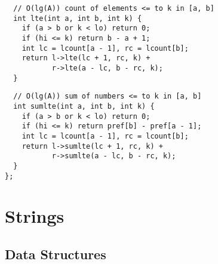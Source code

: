 \documentclass[twoside]{article}
\newcommand{\fileTitleStyle}{\large\underline}
\begin{document}
\begin{multicols*}{2}
\begin{verbatim}
  // O(lg(A)) count of elements <= to k in [a, b]
  int lte(int a, int b, int k) {
    if (a > b or k < lo) return 0;
    if (hi <= k) return b - a + 1;
    int lc = lcount[a - 1], rc = lcount[b];
    return l->lte(lc + 1, rc, k) +
           r->lte(a - lc, b - rc, k);
  }
\end{verbatim}
\vspace{-12pt}
\begin{verbatim}
  // O(lg(A)) sum of numbers <= to k in [a, b]
  int sumlte(int a, int b, int k) {
    if (a > b or k < lo) return 0;
    if (hi <= k) return pref[b] - pref[a - 1];
    int lc = lcount[a - 1], rc = lcount[b];
    return l->sumlte(lc + 1, rc, k) +
           r->sumlte(a - lc, b - rc, k);
  }
};
\end{verbatim}

\sectionfont{\centering\bfseries\Huge}
\vspace{1em}
\section*{Strings}
\vspace{3em}
\subsectionfont{\centering\bfseries\LARGE}
\vspace{0em}
\subsection*{Data Structures}
\vspace{2em}
\subsubsectionfont{\centering\bfseries\Large}
\subsubsectionfont{\fileTitleStyle}

\end{multicols*}
\end{document}
